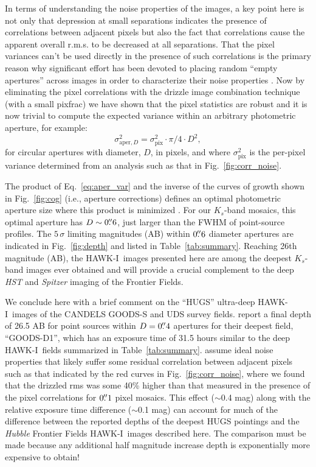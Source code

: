 \documentclass[preprint2]{aastex6}
\gdef\HAWKI{\mbox{HAWK-I}}
\begin{document}
In terms of understanding the noise properties of the images, a key point here is not only that depression at small separations indicates the presence of correlations between adjacent pixels but also the fact that correlations cause the apparent overall r.m.s. to be decreased at all separations.  That the pixel variances can't be used directly in the presence of such correlations \citep{casertano:00} is the primary reason why significant effort has been devoted to placing random ``empty apertures'' across images in order to characterize their noise properties \citep[e.g.,][]{quadri:musyc, whitaker:nmbs, skelton:14}.  Now by eliminating the pixel correlations with the drizzle image combination technique (with a small pixfrac) we have shown that the pixel statistics are robust and it is now trivial to compute the expected variance within an arbitrary photometric aperture, for example:
\begin{equation}
\sigma_{\mathrm{aper}, D}^2 = \sigma_\mathrm{pix}^2\cdot \pi/4 \cdot D^2,
\label{eq:aper_var}
\end{equation}
for circular apertures with diameter, $D$, in pixels, and where $\sigma_\mathrm{pix}^2$ is the per-pixel variance determined from an analysis such as that in Fig.~\ref{fig:corr_noise}.

The product of Eq.~\ref{eq:aper_var} and the inverse of the curves of growth shown in Fig.~\ref{fig:cog} (i.e., aperture corrections) defines an optimal photometric aperture size where this product is minimized \citep{whitaker:nmbs}.  For our $K_s$-band mosaics, this optimal aperture has $D\sim0\mbox{$.\!\!^{\prime\prime}$}6$, just larger than the FWHM of point-source profiles.  The $5\,\sigma$ limiting magnitudes (AB) within $0\mbox{$.\!\!^{\prime\prime}$}6$ diameter apertures are indicated in Fig.~\ref{fig:depth} and listed in Table~\ref{tab:summary}.  Reaching 26th magnitude (AB), the \HAWKI\ images presented here are among the deepest $K_s$-band images ever obtained and will provide a crucial complement to the deep \textit{HST} and \textit{Spitzer} imaging of the Frontier Fields.  

We conclude here with a brief comment on the ``HUGS'' ultra-deep \HAWKI\ images of the CANDELS GOODS-S and UDS survey fields.  \cite{hugs} report a final depth of 26.5 AB for point sources within $D=0\mbox{$.\!\!^{\prime\prime}$}4$ apertures for their deepest field, ``GOODS-D1'', which has an exposure time of 31.5 hours similar to the deep \HAWKI\ fields summarized in Table~\ref{tab:summary}.  \cite{hugs} assume ideal noise properties that likely suffer some residual correlation between adjacent pixels such as that indicated by the red curves in Fig.~\ref{fig:corr_noise}, where we found that the drizzled rms was some 40\% higher than that measured in the presence of the pixel correlations for $0\mbox{$.\!\!^{\prime\prime}$}1$ pixel mosaics.  This effect ($\sim$0.4 mag) along with the relative exposure time difference ($\sim$0.1 mag) can account for much of the difference between the reported depths of the deepest HUGS pointings and the \textit{Hubble} Frontier Fields \HAWKI\ images described here.  The comparison must be made because any additional half magnitude increase depth is exponentially more expensive to obtain!
\end{document}
